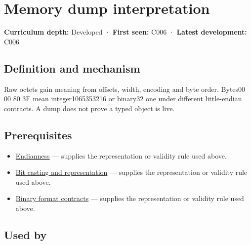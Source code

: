 \hypertarget{appendix-230b59c0676b}{}\label{referencestart:appendix-230b59c0676b}
\section{Memory dump interpretation}\label{appendix-230b59c0676b-memory-dump-interpretation}

\hypertarget{appendix-230b59c0676b-memory-dump-interpretation}{}

\textbf{Curriculum depth:} Developed · \textbf{First seen:} C006 · \textbf{Latest development:} C006

\begin{allmightroledefinition}

\subsection{Definition and mechanism}\label{appendix-230b59c0676b-definition-and-mechanism}

\hypertarget{appendix-230b59c0676b-definition-and-mechanism}{}

Raw octets gain meaning from offsets, width, encoding and byte order. Bytes00 00 80 3F mean integer1065353216 or binary32 one under different little-endian contracts. A dump does not prove a typed object is live.

\end{allmightroledefinition}

\subsection{Prerequisites}\label{appendix-230b59c0676b-prerequisites}

\hypertarget{appendix-230b59c0676b-prerequisites}{}

\begin{itemize}
\tightlist
\item
  \hyperref[appendix-bc07c3d25b18]{Endianness} --- supplies the representation or validity rule used above.
\item
  \hyperref[appendix-34ee45f161c1]{Bit casting and representation} --- supplies the representation or validity rule used above.
\item
  \hyperref[appendix-590bbb2424c1]{Binary format contracts} --- supplies the representation or validity rule used above.
\end{itemize}

\subsection{Used by}\label{appendix-230b59c0676b-used-by}

